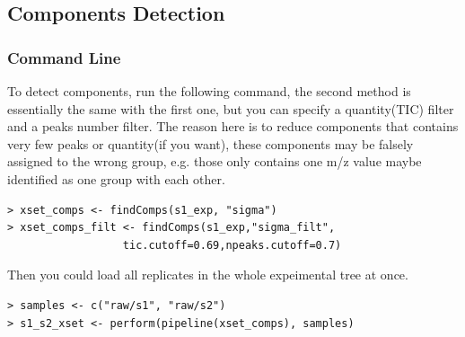 \documentclass[11pt,a4paper]{article}
\begin{document}
\subsection{Components Detection}
\subsubsection*{Command Line}
To detect components, run the following command, the second method is
essentially the same with the first one, but you can specify a
quantity(TIC) filter and a peaks number filter. The reason here is to
reduce components that contains very few peaks or quantity(if you
want), these components may be falsely assigned to the wrong group,
e.g. those only contains one m/z value maybe identified as one group
with each other.
\begin{verbatim}
> xset_comps <- findComps(s1_exp, "sigma")
> xset_comps_filt <- findComps(s1_exp,"sigma_filt",
                  tic.cutoff=0.69,npeaks.cutoff=0.7)
\end{verbatim}
Then you could load all replicates in the whole expeimental tree at once.
\begin{verbatim}
> samples <- c("raw/s1", "raw/s2")
> s1_s2_xset <- perform(pipeline(xset_comps), samples)
\end{verbatim}
\end{document}
